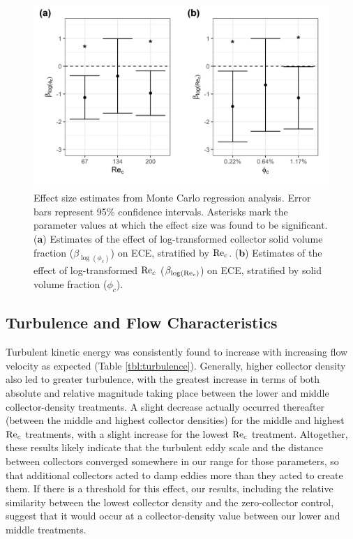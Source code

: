 \documentclass[geosciences,article,submit,moreauthors,pdftex]{Definitions/mdpi}
\begin{document}
\begin{figure}[h]
\centering
\includegraphics[width=5in]{../pics/montecarlo.png}
\caption{Effect size estimates from Monte Carlo regression analysis. Error bars represent 95\% confidence intervals. Asterisks mark the parameter values at which the effect size was found to be significant. (\textbf{a}) Estimates of the effect of log-transformed collector solid volume fraction ($\beta_{\log(\phi_c)}$) on ECE, stratified by $\mathrm{Re}_c$. (\textbf{b}) Estimates of the effect of log-transformed $\mathrm{Re}_c$ ($\beta_{\log(\mathrm{Re}_c)}$) on ECE, stratified by solid volume fraction ($\phi_c$).}
\label{fig:monte}
\end{figure}   

\subsection{Turbulence and Flow Characteristics}

Turbulent kinetic energy was consistently found to increase with increasing flow velocity as expected (Table \ref{tbl:turbulence}). Generally, higher collector density also led to greater turbulence, with the greatest increase in terms of both absolute and relative magnitude taking place between the lower and middle collector-density treatments. A slight decrease actually occurred thereafter (between the middle and highest collector densities) for the middle and highest $\mathrm{Re}_c$ treatments, with a slight increase for the lowest $\mathrm{Re}_c$ treatment. Altogether, these results likely indicate that the turbulent eddy scale and the distance between collectors converged somewhere in our range for those parameters, so that additional collectors acted to damp eddies more than they acted to create them. If there is a threshold for this effect, our results, including the relative similarity between the lowest collector density and the zero-collector control, suggest that it would occur at a collector-density value between our lower and middle treatments.
\end{document}
